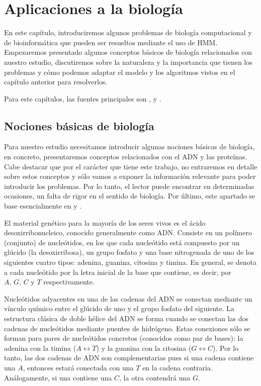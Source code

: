 \chapter{Aplicaciones a la biología}

En este capítulo, introduciremos algunos problemas de biología computacional y de bioinformática que pueden ser resueltos mediante el uso de HMM. Empezaremos presentado algunos conceptos básicos de biología relacionados con nuestro estudio, discutiremos sobre la naturaleza y la importancia que tienen los problemas y cómo podemos adaptar el modelo y los algoritmos vistos en el capítulo anterior para resolverlos.

Para este capítulos, las fuentes principales son \cite{Durbin}, \cite{Yoon} y \cite[Capítulo 8]{Vidyasagar}.

\section{Nociones básicas de biología}
Para nuestro estudio necesitamos introducir algunas nociones básicas de biología, en concreto, presentaremos conceptos relacionados con el ADN y las proteínas. Cabe destacar que por el carácter que tiene este trabajo, no entraremos en detalle sobre estos conceptos y sólo vamos a exponer la información relevante para poder introducir los problemas. Por lo tanto, el lector puede encontrar en determinadas ocasiones, un falta de rigor en el sentido de biología. Por último, este apartado se base esencialmente en \cite[Capítulo 8]{Vidyasagar} y \cite[Apéndice A]{Warren}.

El material genético para la mayoría de los seres vivos es el ácido desoxirribonucleico, conocido generalmente como ADN. Consiste en un polímero (conjunto) de nucleótidos, en los que cada nucleótido está compuesto por un glúcido (la desoxirribosa), un grupo fosfato y una base nitrogenada de uno de los siguientes cuatro tipos: adenina, guanina, citosina y timina. En general, se denota a cada nucleótido por la letra inicial de la base que contiene, es decir, por $A,\, G,\, C$ y $T$ respectivamente. 

Nucleótidos adyacentes en una de las cadenas del ADN se conectan mediante un vínculo químico entre el glúcido de uno y el grupo fosfato del siguiente. La estructura clásica de doble hélice del ADN se forma cuando se conectan las dos cadenas de nucleótidos mediante puentes de hidrógeno. Estas conexiones sólo se forman para pares de nucleótidos concretos (conocidos como par de bases): la adenina con la timina ($A\leftrightarrow T$) y la guanina con la citosina ($G\leftrightarrow C$). Por lo tanto, las dos cadenas de ADN son complementarias pues si una cadena contiene una $A$, entonces estará conectada con una $T$ en la cadena contraria. Análogamente, si una contiene una $C$, la otra contendrá una $G$. 


